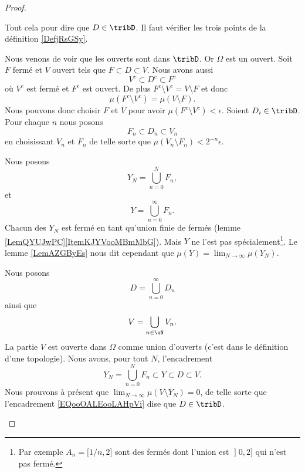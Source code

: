 \begin{proof}
\begin{subproof}
		Tout cela pour dire que \( D\in\tribD\).
		Il faut vérifier les trois points de la définition \ref{DefjRsGSy}.
		\begin{subproof}
			\spitem[\( \Omega\in\tribD\)]
			Nous venons de voir que les ouverts sont dans \( \tribD\). Or \( \Omega\) est un ouvert.
			Soit \( F\) fermé et \( V\) ouvert tels que \( F\subset D\subset V\). Nous avons aussi
			\begin{equation}
				V^c\subset D^c\subset F^c
			\end{equation}
			où \( V^c\) est fermé et \( F^c\) est ouvert. De plus \( F^c\setminus V^c = V\setminus F\) et donc
			\begin{equation}
				\mu(F^c\setminus V^c)=\mu(V\setminus F).
			\end{equation}
			Nous pouvons donc choisir \( F\) et \( V\) pour avoir \( \mu(F^c\setminus V^c)<\epsilon\).
			Soient \( D_i\in \tribD\). Pour chaque \( n\) nous posons
			\begin{equation}
				F_n\subset D_n\subset V_n
			\end{equation}
			en choisissant \( V_n\) et \( F_n\) de telle sorte que \( \mu(V_n\setminus F_n)<2^{-n}\epsilon\).

			Nous posons
			\begin{equation}
				Y_N=\bigcup_{n=0}^NF_n,
			\end{equation}
			et
			\begin{equation}
				Y=\bigcup_{n=0}^{\infty}F_n.
			\end{equation}
			Chacun des \( Y_N\) est fermé en tant qu'union finie de fermés (lemme \ref{LemQYUJwPC}\ref{ItemKJYVooMBmMbG}). Mais \( Y\) ne l'est pas spécialement\footnote{Par exemple \( A_n=\mathopen[ 1/n , 2 \mathclose]\) sont des fermés dont l'union est \( \mathopen] 0 , 2 \mathclose]\) qui n'est pas fermé.}. Le lemme \ref{LemAZGByEs} nous dit cependant que \( \mu(Y)=\lim_{N\to \infty} \mu(Y_N)\).

			Nous posons
			\begin{equation}
				D=\bigcup_{n=0}^{\infty}D_n
			\end{equation}
			ainsi que
			\begin{equation}
				V=\bigcup_{n\in \eN} V_n.
			\end{equation}
			La partie \( V\) est ouverte dans \( \Omega\) comme union d'ouverts (c'est dans le définition d'une topologie). Nous avons, pour tout \( N\), l'encadrement
			\begin{equation}        \label{EQooOALEooLAHpVi}
				Y_N=\bigcup_{n=0}^NF_n\subset Y\subset D\subset V.
			\end{equation}
			Nous prouvons à présent que \( \lim_{N\to \infty} \mu(V\setminus Y_N)=0\), de telle sorte que l'encadrement \eqref{EQooOALEooLAHpVi} dise que \( D\in\tribD\).


\end{subproof}
\end{subproof}
\end{proof}
